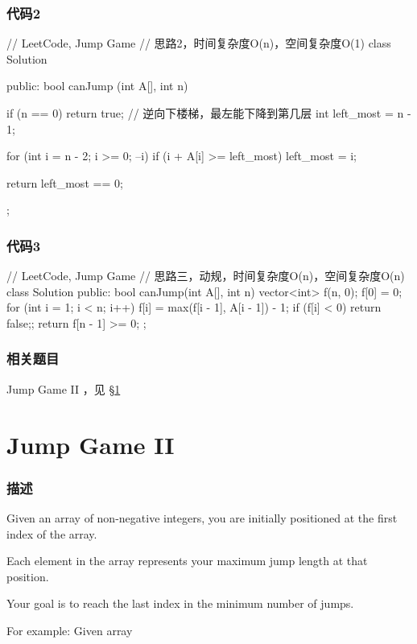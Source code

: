 \subsubsection{代码2}
\begin{Code}
	// LeetCode, Jump Game
	// 思路2，时间复杂度O(n)，空间复杂度O(1)
	class Solution {
		public:
		bool canJump (int A[], int n) {
			if (n == 0) return true;
			// 逆向下楼梯，最左能下降到第几层
			int left_most = n - 1;
			
			for (int i = n - 2; i >= 0; --i)
			if (i + A[i] >= left_most)
			left_most = i;
			
			return left_most == 0;
		}
	};
\end{Code}


\subsubsection{代码3}
\begin{Code}
	// LeetCode, Jump Game
	// 思路三，动规，时间复杂度O(n)，空间复杂度O(n)
	class Solution {
		public:
		bool canJump(int A[], int n) {
			vector<int> f(n, 0);
			f[0] = 0;
			for (int i = 1; i < n; i++) {
				f[i] = max(f[i - 1], A[i - 1]) - 1;
				if (f[i] < 0) return false;;
			}
			return f[n - 1] >= 0;
		}
	};
\end{Code}


\subsubsection{相关题目}
\begindot
\item Jump Game II ，见 \S \ref{sec:jump-game-ii}
\myenddot


\section{Jump Game II} %
\label{sec:jump-game-ii}


\subsubsection{描述}
Given an array of non-negative integers, you are initially positioned at the first index of the array.

Each element in the array represents your maximum jump length at that position.

Your goal is to reach the last index in the minimum number of jumps.

For example:
Given array 

